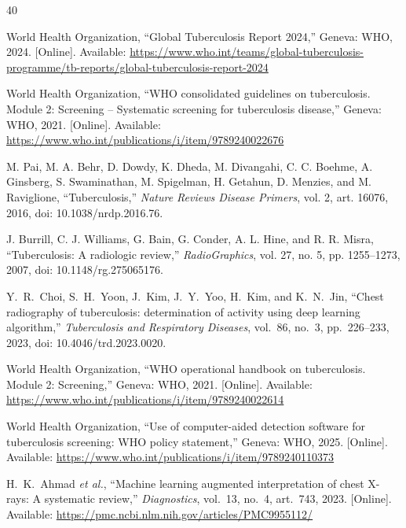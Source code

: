 \documentclass[conference, letterpaper]{IEEEtran}
\begin{document}
\begin{thebibliography}{40}

World Health Organization, ``Global Tuberculosis Report 2024,'' Geneva: WHO, 2024. [Online]. Available: \url{https://www.who.int/teams/global-tuberculosis-programme/tb-reports/global-tuberculosis-report-2024}

World Health Organization, ``WHO consolidated guidelines on tuberculosis. Module 2: Screening -- Systematic screening for tuberculosis disease,'' Geneva: WHO, 2021. [Online]. Available: \url{https://www.who.int/publications/i/item/9789240022676}

M. Pai, M. A. Behr, D. Dowdy, K. Dheda, M. Divangahi, C. C. Boehme, A. Ginsberg, S. Swaminathan, M. Spigelman, H. Getahun, D. Menzies, and M. Raviglione, ``Tuberculosis,'' \emph{Nature Reviews Disease Primers}, vol. 2, art. 16076, 2016, doi: 10.1038/nrdp.2016.76.

J. Burrill, C. J. Williams, G. Bain, G. Conder, A. L. Hine, and R. R. Misra, ``Tuberculosis: A radiologic review,'' \emph{RadioGraphics}, vol. 27, no. 5, pp. 1255--1273, 2007, doi: 10.1148/rg.275065176.

Y.~R.~Choi, S.~H.~Yoon, J.~Kim, J.~Y.~Yoo, H.~Kim, and K.~N.~Jin, ``Chest radiography of tuberculosis: determination of activity using deep learning algorithm,'' \textit{Tuberculosis and Respiratory Diseases}, vol.~86, no.~3, pp.~226--233, 2023, doi: 10.4046/trd.2023.0020.

World Health Organization, ``WHO operational handbook on tuberculosis. Module 2: Screening,'' Geneva: WHO, 2021. [Online]. Available: \url{https://www.who.int/publications/i/item/9789240022614}

World Health Organization, ``Use of computer-aided detection software for tuberculosis screening: WHO policy statement,'' Geneva: WHO, 2025. [Online]. Available: \url{https://www.who.int/publications/i/item/9789240110373}

H.~K.~Ahmad \textit{et al.}, ``Machine learning augmented interpretation of chest X-rays: A systematic review,'' \textit{Diagnostics}, vol.~13, no.~4, art.~743, 2023. [Online]. Available: \url{https://pmc.ncbi.nlm.nih.gov/articles/PMC9955112/}


\end{thebibliography}
\end{document}
